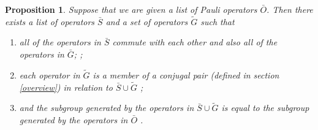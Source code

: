 \documentclass[twocolumn,showpacs,preprintnumbers,amsmath,amssymb,nofootinbib,pra,floatfix]{revtex4}
\newtheorem{proposition}{Proposition}
\newcommand{\lst}{\bar}
\newcommand{\set}{\tilde}
\begin{document}
\begin{proposition} \label{proposition-SG} Suppose that we are given a list of Pauli operators $\lst O$.  Then there exists a list of operators $\lst S$ and a set of operators $\set G$ such that
\begin{enumerate}
\item all of the operators in $\lst S$ commute with each other and also all of the operators in $\lst G$; \label{stabs-commute-with-G};
\item each operator in $\set G$ is a member of a \emph{conjugal pair} (defined in section \ref{overview}) in relation to $\lst S \cup \set G $ \label{conjugal-pairs-commute-with-SAG};
\item and the subgroup generated by the operators in $\lst S\cup \set G$ is equal to the subgroup generated by the operators in $\lst O$ \label{SAG-spans-all}.
\end{enumerate}
\end{proposition}
\end{document}
